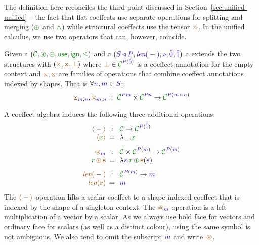 The definition here reconciles the third point discussed in Section~\ref{sec:unified-unified} --
the fact that flat coeffects use separate operations for splitting and merging ($\cpar$ and $\czip$)
while structural coeffects use the tensor $\atimes$. In the unified calculus, we use two operators
that can, however, coincide.

\begin{definition}
Given a  $(\C, \cseq, \cpar, \cunit, \czero, \cleq)$ and a 
 $(\SHP, \slen{-}, \stimes, \sempty, \sunit)$ a \emph{} extends the two structures with $(\azip, \apar, \azero)$ where $\azero \in \C^{\SP(\sempty)}$
is a coeffect annotation for the empty context and $\azip, \apar$ are families of operations that 
combine coeffect annotations indexed by shapes. That is $\forall \sclrd{n},\sclrd{m} \in \SH$:
%
\begin{equation*}
\apar_{\sclrd{m},\sclrd{n}}, \azip_{\sclrd{m},\sclrd{n}} ~:~ \C^{\SP \sclrd{m}} \times \C^{\SP \sclrd{n}} \rightarrow \C^{\SP (\sclrd{m}\,\stimes\,\sclrd{n})}
\end{equation*}
\end{definition}

\noindent
A coeffect algebra induces the following three additional operations:
%
\begin{equation*}
\begin{array}{rclcrcl}
 \alift{-} &\narrow{:}& \C \rightarrow \C^{\SP(\sunit)}  \\
 \alift{\cclrd{x}} &\narrow{=}& \lambda \_ . \cclrd{x}   \\
\\[-0.5em]
 \aseq_{\sclrd{m}} &\narrow{:}&  \C \times \C^{\SP(\sclrd{m})} \rightarrow \C^{\SP(\sclrd{m})}   \\
 \cclrd{r}\, \aseq\, \aclrd{\textbf{s}} &\narrow{=}& \lambda \sclrd{s} . \cclrd{r}\, \cseq\, \aclrd{\textbf{s}}(\sclrd{s}) \\
\\[-0.5em]
 \alen{-} &\narrow{:}& \C^{\SP(\sclrd{m})} \rightarrow \sclrd{m}\\
 \alen{\aclrd{\textbf{r}}} &\narrow{=}& \sclrd{m}
\end{array}
\end{equation*}
%
The $\alift{-}$ operation lifts a scalar coeffect to a shape-indexed coeffect that is indexed by 
the shape of a singleton context. The $\aseq_{\sclrd{m}}$ operation is a left multiplication of a 
vector by a scalar. As we always use bold face for vectors and ordinary face for scalars (as well 
as a distinct colour), using the same symbol is not ambiguous. We also tend to omit the subscript
$\sclrd{m}$ and write~$\aseq$. 

